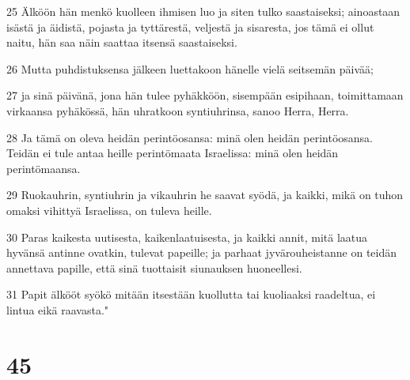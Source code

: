 \par 25 Älköön hän menkö kuolleen ihmisen luo ja siten tulko saastaiseksi; ainoastaan isästä ja äidistä, pojasta ja tyttärestä, veljestä ja sisaresta, jos tämä ei ollut naitu, hän saa näin saattaa itsensä saastaiseksi.
\par 26 Mutta puhdistuksensa jälkeen luettakoon hänelle vielä seitsemän päivää;
\par 27 ja sinä päivänä, jona hän tulee pyhäkköön, sisempään esipihaan, toimittamaan virkaansa pyhäkössä, hän uhratkoon syntiuhrinsa, sanoo Herra, Herra.
\par 28 Ja tämä on oleva heidän perintöosansa: minä olen heidän perintöosansa. Teidän ei tule antaa heille perintömaata Israelissa: minä olen heidän perintömaansa.
\par 29 Ruokauhrin, syntiuhrin ja vikauhrin he saavat syödä, ja kaikki, mikä on tuhon omaksi vihittyä Israelissa, on tuleva heille.
\par 30 Paras kaikesta uutisesta, kaikenlaatuisesta, ja kaikki annit, mitä laatua hyvänsä antinne ovatkin, tulevat papeille; ja parhaat jyvärouheistanne on teidän annettava papille, että sinä tuottaisit siunauksen huoneellesi.
\par 31 Papit älkööt syökö mitään itsestään kuollutta tai kuoliaaksi raadeltua, ei lintua eikä raavasta."

\chapter{45}

